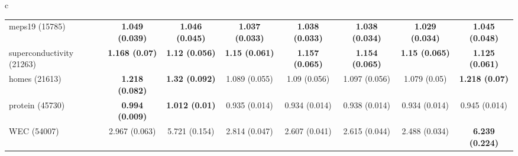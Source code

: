 \documentclass[border=6pt]{standalone}
\begin{document}
\begin{adjustbox}{max width=\linewidth}
\begin{tabular}{c}
\begin{tabular}{lccccccc}
meps19 (15785) & \textbf{1.049 (0.039)} & \textbf{1.046 (0.045)} & \textbf{1.037 (0.033)} & \textbf{1.038 (0.033)} & \textbf{1.038 (0.034)} & \textbf{1.029 (0.034)} & \textbf{1.045 (0.048)}\\
superconductivity (21263) & \textbf{1.168 (0.07)} & \textbf{1.12 (0.056)} & \textbf{1.15 (0.061)} & \textbf{1.157 (0.065)} & \textbf{1.154 (0.065)} & \textbf{1.15 (0.065)} & \textbf{1.125 (0.061)}\\
homes (21613) & \textbf{1.218 (0.082)} & \textbf{1.32 (0.092)} & 1.089 (0.055) & 1.09 (0.056) & 1.097 (0.056) & 1.079 (0.05) & \textbf{1.218 (0.07)}\\
protein (45730) & \textbf{0.994 (0.009)} & \textbf{1.012 (0.01)} & 0.935 (0.014) & 0.934 (0.014) & 0.938 (0.014) & 0.934 (0.014) & 0.945 (0.014)\\
WEC (54007) & 2.967 (0.063) & 5.721 (0.154) & 2.814 (0.047) & 2.607 (0.041) & 2.615 (0.044) & 2.488 (0.034) & \textbf{6.239 (0.224)}\\
\hline
\end{tabular}
\end{tabular}
\end{adjustbox}
\end{document}
